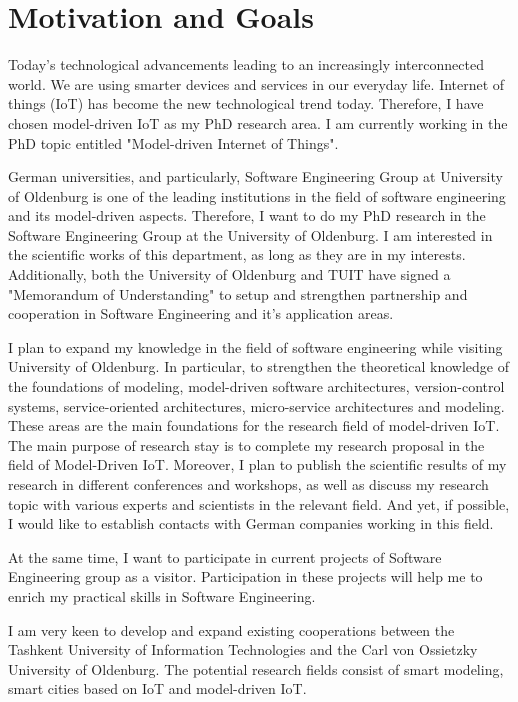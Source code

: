 \documentclass[10pt, oneside]{article}
\begin{document}
\section{Motivation and Goals}
Today’s technological advancements leading to an increasingly interconnected world. We are using smarter devices and services in our everyday life. Internet of things (IoT) has become the new technological trend today. Therefore, I have chosen model-driven IoT as my PhD research area. I am currently working in the PhD topic entitled "Model-driven Internet of Things".

German universities, and particularly, Software Engineering Group at University of Oldenburg is one of the leading institutions in the field of software engineering and its model-driven aspects. Therefore, I want to do my PhD research in the Software Engineering Group at the University of Oldenburg. I am interested in the scientific works of this department, as long as they are in my interests. Additionally, both the University of Oldenburg and TUIT have signed a "Memorandum of Understanding" to setup and strengthen partnership and cooperation in Software 
Engineering and it’s application areas. 

I plan to expand my knowledge in the field of software engineering while visiting University of Oldenburg. In particular, to strengthen the theoretical knowledge of the foundations of modeling, model-driven software architectures, version-control systems, service-oriented architectures, micro-service architectures and modeling. These areas are the main foundations for the research field of model-driven IoT. The main purpose of research stay is to complete my research proposal in the field of Model-Driven IoT. Moreover, I plan to publish the scientific results of my research in different conferences and workshops, as well as discuss my research topic with various experts and scientists in the relevant field. And yet, if possible, I would like to establish contacts with German companies working in this field.

At the same time, I want to participate in current projects of Software Engineering group as a visitor. Participation in these projects will help me to enrich my practical skills in Software Engineering.

I am very keen to develop and expand existing cooperations between the Tashkent University of Information Technologies and the Carl von Ossietzky University of Oldenburg. The potential research fields consist of smart modeling, smart cities based on IoT and model-driven IoT.
\end{document}

